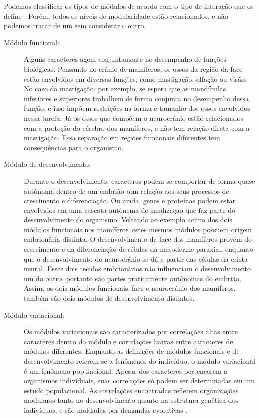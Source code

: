 \documentclass[portuges,]{tufte-handout}
\begin{document}
Podemos classificar os tipos de módulos de acordo com o tipo de
interação que os define \cite{Wagner2007}. Porém, todos os níveis de
modularidade estão relacionados, e não podemos tratar de um sem
considerar o outro.

\begin{description}
\item[Módulo funcional:]
Alguns caracteres agem conjuntamente no desempenho de funções
biológicas. Pensando no crânio de mamíferos, os ossos da região da face
estão envolvidos em diversas funções, como mastigação, olfação ou visão.
No caso da mastigação, por exemplo, se espera que as mandíbulas
inferiores e superiores trabalhem de forma conjunta no desempenho dessa
função, e isso impõem restrições na forma e tamanho dos ossos envolvidos
nessa tarefa. Já os ossos que compõem o neurocrânio estão relacionados
com a proteção do cérebro dos mamíferos, e não tem relação direta com a
mastigação. Essa separação em regiões funcionais diferentes tem
consequências para o organismo.
\item[Módulo de desenvolvimento:]
Durante o desenvolvimento, caracteres podem se comportar de forma quase
autônoma dentro de um embrião com relação aos seus processos de
crescimento e diferenciação. Ou ainda, genes e proteínas podem estar
envolvidos em uma cascata autônoma de sinalização que faz parte do
desenvolvimento do organismo. Voltando ao exemplo acima dos dois módulos
funcionais nos mamíferos, estes mesmos módulos possuem origem
embrionária distinta. O desenvolvimento da face dos mamíferos provém do
crescimento e da diferenciação de células da mesoderme paraxial,
enquanto que o desenvolvimento do neurocrânio se dá a partir das células
da crista neural. Esses dois tecidos embrionários não influenciam o
desenvolvimento um do outro, portanto são partes praticamente autônomas
do embrião. Assim, os dois módulos funcionais, face e neurocrânio dos
mamíferos, também são dois módulos de desenvolvimento distintos.
\item[Módulo variacional:]
Os módulos variacionais são caracterizados por correlações altas entre
caracteres dentro do módulo e correlações baixas entre caracteres de
módulos diferentes. Enquanto as definições de módulos funcionais e de
desenvolvimento referem-se a fenômenos do indivíduo, o módulo
variacional é um fenômeno populacional. Apesar dos caracteres
pertencerem a organismos individuais, suas correlações só podem ser
determinadas em um estudo populacional. As correlações encontradas
refletem organizações modulares tanto no desenvolvimento quanto na
estrutura genética dos indivíduos, e são moldadas por demandas
evolutivas \cite{Klingenberg2008}.
\end{description}
\end{document}

